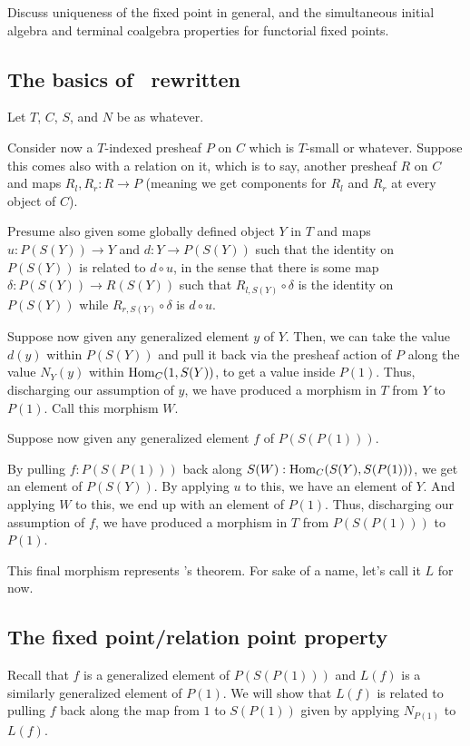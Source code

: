 \begin{TODOblock}
Discuss uniqueness of the fixed point in general, and the simultaneous initial algebra and terminal coalgebra properties for functorial fixed points.
\end{TODOblock}

\subsection{The basics of \Loeb\ rewritten}
Let $T$, $C$, $S$, and $N$ be as whatever. \TODO

Consider now a $T$-indexed presheaf $P$ on $C$ which is $T$-small or whatever. \TODO Suppose this comes also with a relation on it, which is to say, another presheaf $R$ on $C$ and maps $R_l, R_r : R \to P$ (meaning we get components for $R_l$ and $R_r$ at every object of $C$).

Presume also given some globally defined  object $Y$ in $T$ and maps $u: P(S(Y)) \to Y$ and $d : Y \to P(S(Y))$ such that the identity on $P(S(Y))$ is related to $d \circ u$, in the sense that there is some map $\delta : P(S(Y)) \to R(S(Y))$ such that $R_{l, S(Y)} \circ \delta$ is the identity on $P(S(Y))$ while $R_{r, S(Y)} \circ \delta$ is $d \circ u$.

Suppose now given any generalized element $y$ of $Y$. Then, we can take the value $d(y)$ within $P(S(Y))$ and pull it back via the presheaf action of $P$ along the value $N_Y(y)$ within $\operatorname{Hom}_C(1, S(Y))$, to get a value inside $P(1)$. Thus, discharging our assumption of $y$, we have produced a morphism in $T$ from $Y$ to $P(1)$. Call this morphism $W$.

Suppose now given any generalized element $f$ of $P(S(P(1)))$.

By pulling $f :P(S(P(1)))$ back along $S(W) : \operatorname{Hom}_C(S(Y), S(P(1)))$, we get an element of $P(S(Y))$. By applying $u$ to this, we have an element of $Y$. And applying $W$ to this, we end up with an element of $P(1)$. Thus, discharging our assumption of $f$, we have produced a morphism in $T$ from $P(S(P(1)))$ to $P(1)$.

This final morphism represents \Loeb's theorem. For sake of a name, let's call it $L$ for now.

\subsection{The fixed point/relation point property}
Recall that $f$ is a generalized element of $P(S(P(1)))$ and $L(f)$ is a similarly generalized element of $P(1)$. We will show that $L(f)$ is related to pulling $f$ back along the map from $1$ to $S(P(1))$ given by applying $N_{P(1)}$ to $L(f)$.

